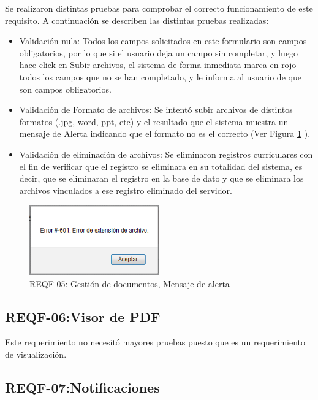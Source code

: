 Se realizaron distintas pruebas para comprobar el correcto funcionamiento de este requisito. A continuación se describen las distintas pruebas realizadas:
\begin{itemize}
	\item Validación nula: Todos los  campos solicitados en  este formulario son campos obligatorios, por lo que si el usuario deja un campo sin completar, y luego  hace click en Subir archivos, el sistema de forma inmediata marca en rojo todos los campos que no se han completado, y le informa al usuario de que son campos obligatorios.
	
	\item Validación de Formato de archivos: Se intentó subir archivos de distintos formatos (.jpg, word, ppt, etc) y el resultado que el sistema muestra un mensaje de Alerta indicando que el formato no es el correcto (Ver Figura \ref{REQF-05} ).
	
	\item Validación de eliminación de archivos: Se eliminaron registros curriculares con el fin de verificar que el registro se eliminara en su totalidad del sistema, es decir, que se eliminaran el registro en la base de dato y que se eliminara los archivos vinculados a ese registro eliminado del servidor.
\end{itemize}


\begin{figure}[H]
	\centering
	\includegraphics[width=0.5\textwidth]{images/Capitulo_5/REQF-05.png}
	\caption[REQF-05: Gestión de documentos, Mensaje de alerta ]{REQF-05: Gestión de documentos, Mensaje de alerta }
	\label{REQF-05}
\end{figure}
\subsection{REQF-06:Visor de PDF}

Este requerimiento no necesitó mayores pruebas puesto que es un requerimiento de visualización.

\subsection{REQF-07:Notificaciones}


